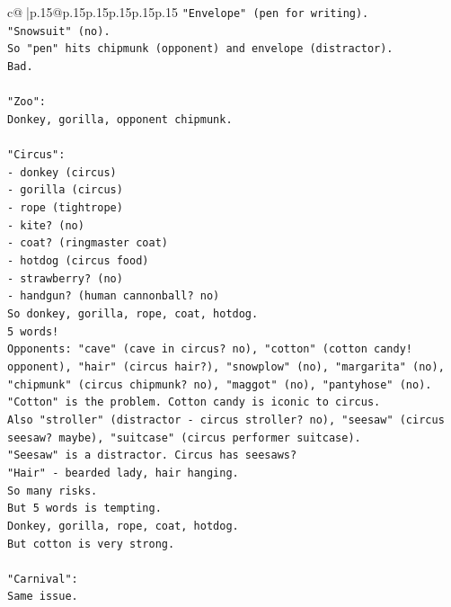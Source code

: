 \documentclass{article}
\begin{document}
{\begin{supertabular}{c@{$\;$}|p{.15\linewidth}@{}p{.15\linewidth}p{.15\linewidth}p{.15\linewidth}p{.15\linewidth}p{.15\linewidth}}
{{{\texttt{"Envelope" (pen for writing).} \\
\texttt{"Snowsuit" (no).} \\
\texttt{So "pen" hits chipmunk (opponent) and envelope (distractor).} \\
\texttt{Bad.} \\
\\ 
\texttt{"Zoo":} \\
\texttt{Donkey, gorilla, opponent chipmunk.} \\
\\ 
\texttt{"Circus":} \\
\texttt{{-} donkey (circus)} \\
\texttt{{-} gorilla (circus)} \\
\texttt{{-} rope (tightrope)} \\
\texttt{{-} kite? (no)} \\
\texttt{{-} coat? (ringmaster coat)} \\
\texttt{{-} hotdog (circus food)} \\
\texttt{{-} strawberry? (no)} \\
\texttt{{-} handgun? (human cannonball? no)} \\
\texttt{So donkey, gorilla, rope, coat, hotdog.} \\
\texttt{5 words!} \\
\texttt{Opponents: "cave" (cave in circus? no), "cotton" (cotton candy! opponent), "hair" (circus hair?), "snowplow" (no), "margarita" (no), "chipmunk" (circus chipmunk? no), "maggot" (no), "pantyhose" (no).} \\
\texttt{"Cotton" is the problem. Cotton candy is iconic to circus.} \\
\texttt{Also "stroller" (distractor {-} circus stroller? no), "seesaw" (circus seesaw? maybe), "suitcase" (circus performer suitcase).} \\
\texttt{"Seesaw" is a distractor. Circus has seesaws?} \\
\texttt{"Hair" {-} bearded lady, hair hanging.} \\
\texttt{So many risks.} \\
\texttt{But 5 words is tempting.} \\
\texttt{Donkey, gorilla, rope, coat, hotdog.} \\
\texttt{But cotton is very strong.} \\
\\ 
\texttt{"Carnival":} \\
\texttt{Same issue.} \\
\\ 
}}}
\end{supertabular}}
\end{document}
